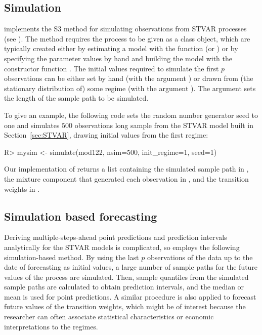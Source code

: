 \documentclass[nojss]{jss}
\begin{document}
\subsection{Simulation}\label{sec:simu}

 implements the S3 method  for simulating observations from STVAR processes (see ). The method requires the process to be given as a class  object, which are typically created either by estimating a model with the function  (or ) or by specifying the parameter values by hand and building the model with the constructor function . The initial values required to simulate the first $p$ observations can be either set by hand (with the argument ) or drawn from (the stationary distribution of) some regime (with the argument ). The argument  sets the length of the sample path to be simulated.

To give an example, the following code sets the random number generator seed to one and simulates $500$ observations long sample from the STVAR model built in Section~\ref{sec:STVAR}, drawing initial values from the first regime:
%
\begin{CodeChunk}
\begin{CodeInput}
R> mysim <- simulate(mod122, nsim=500, init_regime=1, seed=1)
\end{CodeInput}
\end{CodeChunk}
%
Our implementation of  returns a list containing the simulated sample path in , the mixture component that generated each observation in , and the transition weights in .

\subsection{Simulation based forecasting}

Deriving multiple-steps-ahead point predictions and prediction intervals analytically for the STVAR models is complicated, so  employs the following simulation-based method. By using the last $p$ observations of the data up to the date of forecasting as initial values, a large number of sample paths for the future values of the process are simulated. Then, sample quantiles from the simulated sample paths are calculated to obtain prediction intervals, and the median or mean is used for point predictions. A similar procedure is also applied to forecast future values of the transition weights, which might be of interest because the researcher can often associate statistical characteristics or economic interpretations to the regimes.
\end{document}
